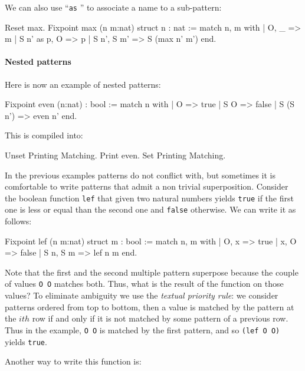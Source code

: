 We can also use ``\texttt{as} {\ident}'' to associate a name to a
sub-pattern:

\begin{coq_example}
Reset max.
Fixpoint max (n m:nat) {struct n} : nat :=
  match n, m with
  | O, _ => m
  | S n' as p, O => p
  | S n', S m' => S (max n' m')
  end.
\end{coq_example}

\paragraph{Nested patterns}

Here is now an example of nested patterns:

\begin{coq_example}
Fixpoint even (n:nat) : bool :=
  match n with
  | O => true
  | S O => false
  | S (S n') => even n'
  end.
\end{coq_example}

This is compiled into:

\begin{coq_example}
Unset Printing Matching.
Print even.
Set Printing Matching.
\end{coq_example}

In the previous examples patterns do not conflict with, but
sometimes it is comfortable to write patterns that admit a non
trivial superposition. Consider
the boolean function \texttt{lef} that given two natural numbers
yields \texttt{true} if the first one is less or equal than the second
one and \texttt{false} otherwise. We can write it as follows:

\begin{coq_example}
Fixpoint lef (n m:nat) {struct m} : bool :=
  match n, m with
  | O, x => true
  | x, O => false
  | S n, S m => lef n m
  end.
\end{coq_example}

Note that the first and the second multiple pattern superpose because
the couple of values \texttt{O O} matches both. Thus, what is the result
of the function on those values?  To eliminate ambiguity we use the
{\em textual priority rule}: we consider patterns ordered from top to
bottom, then a value is matched by the pattern at the $ith$ row if and
only if it is not matched by some pattern of a previous row. Thus in the
example,
\texttt{O O} is matched by the first pattern, and so \texttt{(lef O O)}
yields \texttt{true}.

Another way to write  this function is:

